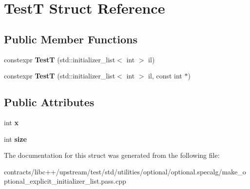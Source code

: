 \hypertarget{struct_test_t}{}\section{TestT Struct Reference}
\label{struct_test_t}
\subsection*{Public Member Functions}
\begin{DoxyCompactItemize}
\item 
\mbox{\label{struct_test_t_a9fcdd91767836ed89e0796f9810f7ec0}} 
constexpr {\bfseries TestT} (std\+::initializer\+\_\+list$<$ int $>$ il)
\item 
\mbox{\label{struct_test_t_a5563eafcd3dc4aa8fe769290a1fb2d69}} 
constexpr {\bfseries TestT} (std\+::initializer\+\_\+list$<$ int $>$ il, const int $\ast$)
\end{DoxyCompactItemize}
\subsection*{Public Attributes}
\begin{DoxyCompactItemize}
\item 
\mbox{\label{struct_test_t_a2083e715b43f21abc2d6a58d1e176aba}} 
int {\bfseries x}
\item 
\mbox{\label{struct_test_t_ade537fbfbd8c725708a5cf836c907b56}} 
int {\bfseries size}
\end{DoxyCompactItemize}


The documentation for this struct was generated from the following file\+:\begin{DoxyCompactItemize}
\item 
contracts/libc++/upstream/test/std/utilities/optional/optional.\+specalg/make\+\_\+optional\+\_\+explicit\+\_\+initializer\+\_\+list.\+pass.\+cpp\end{DoxyCompactItemize}
